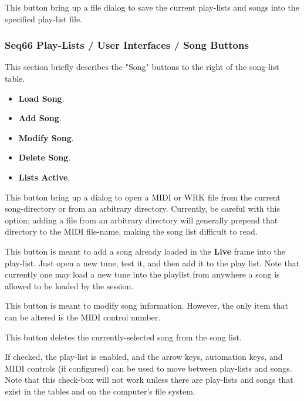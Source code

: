    This button bring up a file dialog to save the current play-lists and songs
   into the specified play-list file.

\subsubsection{Seq66 Play-Lists / User Interfaces / Song Buttons}
\label{subsubsec:playlist_ui_song_buttons}

   This section briefly describes the "Song" buttons to the right of the
   song-list table.

   \begin{itemize}
      \item \textbf{Load Song}.
      \item \textbf{Add Song}.
      \item \textbf{Modify Song}.
      \item \textbf{Delete Song}.
      \item \textbf{Lists Active}.
   \end{itemize}

   \setcounter{ItemCounter}{0}      %

   This button bring up a dialog to open a MIDI or WRK file from
   the current song-directory or from an arbitrary directory.
   Currently, be careful with this option; adding a file from an arbitrary
   directory will generally prepend that directory to the MIDI file-name,
   making the song list difficult to read.

   This button is meant to add a song already loaded in the \textbf{Live} frame
   into the play-list.  Just open a new tune, test it, and then add it to the
   play list.  Note that currently one may load a new tune into the playlist
   from anywhere a song is allowed to be loaded by the session.

   This button is meant to modify song information.  However, the only item
   that can be altered is the MIDI control number.

   This button deletes the currently-selected song from the song list.

   If checked, the play-list is enabled, and the arrow keys, automation keys,
   and MIDI controls (if configured) can be used to move between play-lists and
   songs.
   Note that this check-box will not work unless there are play-lists and songs
   that exist in the tables and on the computer's file system.

